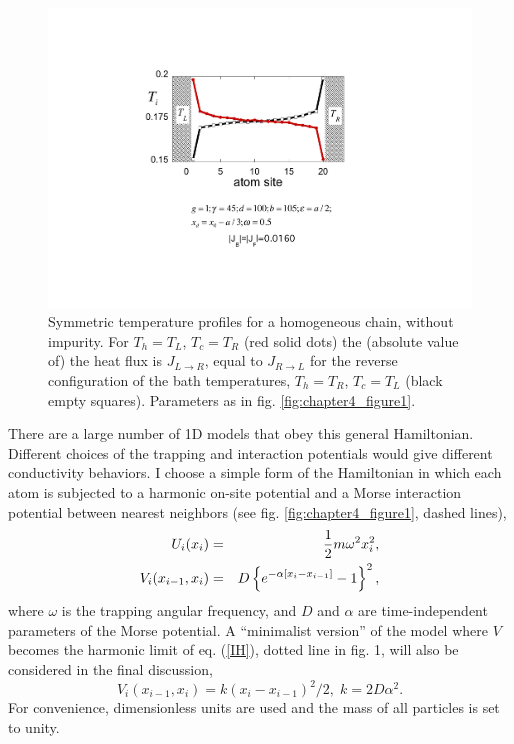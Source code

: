 \begin{figure}
\centering
\includegraphics[width=0.75\linewidth]{Figures/FIG2.pdf}
\caption{Symmetric temperature profiles for a homogeneous chain, without impurity.  For $T_{h}=T_{L}$, $T_c=T_R$ (red solid dots) the (absolute value of) the heat flux is $J_{L\rightarrow R}$, equal to $J_{R\rightarrow L}$ for the reverse configuration of the bath temperatures, $T_{h}=T_{R}$, $T_c=T_L$
(black empty squares). Parameters as in fig. \ref{fig:chapter4_figure1}.}
\label{fig:chapter4_figure2}
\end{figure}

There are a large number of 1D models that obey this general Hamiltonian. Different choices of the trapping and interaction potentials would give different conductivity behaviors. I choose a simple form of the Hamiltonian in which each atom is subjected to a harmonic on-site potential and a Morse interaction potential between nearest neighbors (see fig. \ref{fig:chapter4_figure1}, dashed lines),
%
\begin{eqnarray}
\label{HO}
U_i(x_i)&=&{1 \over 2} m \omega^2 x^2_i,
\\
\label{IH}
V_i(x_{i-1},x_i)&=&D\left \{e^{-\alpha [x_i-x_{i-1}]}-1\right \}^2,
\end{eqnarray}
%
where $\omega$ is the trapping angular frequency, and $D$ and $\alpha$ are time-independent parameters of the Morse potential.
A ``minimalist version'' of the model where $V$ becomes the harmonic limit of eq. (\ref{IH}), dotted line in fig. 1,
 will also be considered in the final discussion,
%
\begin{equation}
\label{Vhar}
{V}_i(x_{i-1},x_i)=k(x_i-x_{i-1})^2/2,\;k=2D\alpha^2.
\end{equation}
%
For convenience, dimensionless units are used and the mass of all particles is set to unity.

